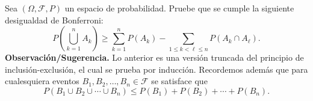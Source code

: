 \documentclass[12pt,a4paper]{article}
\begin{document}
    \begin{mdframed}[style=mdbluebox,frametitle={Ejercicio 8}]
        Sea $(\Omega,\mathcal{F},P)$ un espacio de probabilidad. Pruebe que se cumple la siguiente desigualdad de Bonferroni:
        \[
        P\left(\bigcup_{k=1}^{n}A_k\right)
        \ge
        \sum_{k=1}^{n}P(A_k)
        -
        \sum_{1\le k<\ell\le n}P(A_k\cap A_\ell).
        \]
        \textbf{Observación/Sugerencia.} Lo anterior es una versión truncada del principio de inclusión-exclusión,
        el cual se prueba por inducción. Recordemos además que para cualesquiera eventos
        $B_1,B_2,\dots,B_n\in\mathcal{F}$ se satisface que
        \[
        P(B_1\cup B_2\cup \cdots \cup B_n)
        \le
        P(B_1)+P(B_2)+\cdots+P(B_n).
        \]
    \end{mdframed}
\end{document}
